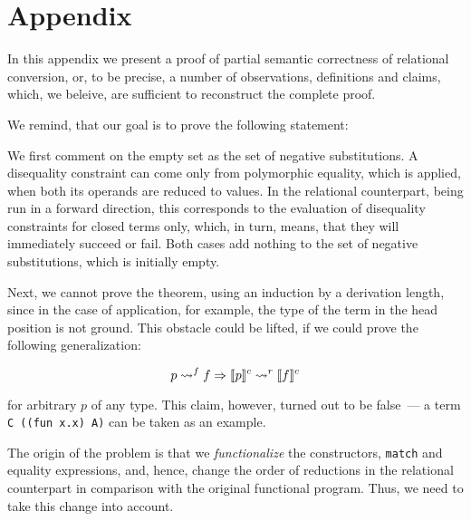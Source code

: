 \section{Appendix}
\label{appendix}

In this appendix we present a proof of partial semantic correctness of relational conversion, or, to be precise, 
a number of observations, definitions and claims, which, we beleive, are sufficient to reconstruct
the complete proof. 

We remind, that our goal is to prove the following statement:

  
We first comment on the empty set as the set of negative substitutions. A disequality constraint can
come only from polymorphic equality, which is applied, when both its operands are reduced to
values. In the relational counterpart, being run in a forward direction, this corresponds to the evaluation of disequality constraints for
closed terms only, which, in turn, means, that they will immediately succeed or fail. Both cases
add nothing to the set of negative substitutions, which is initially empty. 

Next, we cannot prove the theorem, using an induction by a derivation length, since in the case of
application, for example, the type of the term in the head position is not ground. This 
obstacle could be lifted, if we could prove the following generalization:

$$
p\leadsto^f f \Rightarrow \llbracket{p}\rrbracket^c\leadsto^r\llbracket{f}\rrbracket^c
$$ 

\noindent for arbitrary $p$ of any type. This claim, however, turned out to be false~--- a term
\lstinline|C ((fun x.x) A)| can be taken as an example.  

The origin of the problem is that we \emph{functionalize} the constructors, \lstinline|match| and
equality expressions, and, hence, change the order of reductions in the relational counterpart in 
comparison with the original functional program. Thus, we need to take this change into account.

